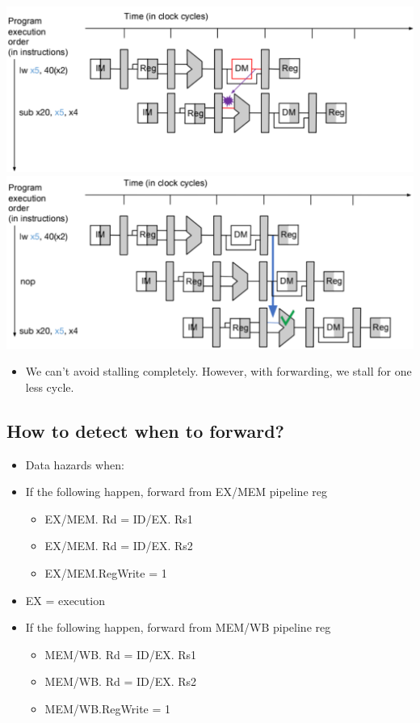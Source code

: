 \documentclass[10pt]{article}
\begin{document}
\begin{center}
    \includegraphics*[scale=0.6]{W3_12.png}\\
    \includegraphics*[scale=0.6]{W3_13.png}
\end{center}
\begin{itemize}
    \item We can't avoid stalling completely.  However, with forwarding, we stall for one less cycle.
\end{itemize}

\subsection*{How to detect when to forward?}
\begin{itemize}
    \item Data hazards when:
    \item If the following happen, forward from EX/MEM pipeline reg
    \begin{itemize}
        \item EX/MEM. Rd = ID/EX. Rs1
        \item EX/MEM. Rd = ID/EX. Rs2
        \item EX/MEM.RegWrite = 1
    \end{itemize}
    \item EX = execution
    \item If the following happen, forward from MEM/WB pipeline reg
    \begin{itemize}
        \item MEM/WB. Rd = ID/EX. Rs1
        \item MEM/WB. Rd = ID/EX. Rs2
        \item MEM/WB.RegWrite = 1
    \end{itemize}
\end{itemize}
\end{document}
